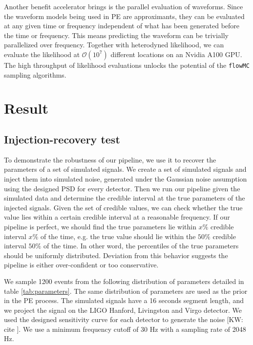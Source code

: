\documentclass[twocolumn]{aastex631}
\newcommand{\kw}[1]{{\color{rb4}[KW: #1 ]}}
\begin{document}
Another benefit accelerator brings is the parallel evaluation of waveforms. Since
the waveform models being used in PE are approximants, they can be evaluated at
any given time or frequency independent of what has been generated before the
time or frequency. This means predicting the waveform can be trivially
parallelized over frequency. Together with heterodyned likelihood, we can
evaluate the likelihood at $\mathcal{O}(10^7)$ different locations on an Nvidia
A100 GPU. The high throughput of likelihood evaluations unlocks the potential of
the \texttt{flowMC} sampling algorithms.

\section{Result}
\label{sec: Result}
\subsection{Injection-recovery test}

To demonstrate the robustness of our pipeline, we use it to recover the
parameters of a set of simulated signals. We create a set of simulated signals
and inject them into simulated noise, generated under the Gaussian noise
assumption using the designed PSD for every detector. Then we run our pipeline
given the simulated data and determine the credible interval at the true
parameters of the injected signals. Given the set of credible values, we can
check whether the true value lies within a certain credible interval at a
reasonable frequency. If our pipeline is perfect, we should find the true
parameters lie within $x\%$ credible interval $x\%$ of the time, e.g. the true
value should lie within the $50\%$ credible interval $50\%$ of the time. In
other word, the percentiles of the true parameters should be uniformly
distributed. Deviation from this behavior suggests the pipeline is either
over-confident or too conservative. 

We sample 1200 events from the following distribution of parameters detailed in
table \ref{tab:parameters}.
The same distribution of parameters are used as the prior in the PE process.
The simulated signals have a 16 seconds segment length,
and we project the signal on the LIGO Hanford, Livingston and Virgo detector.
We used the designed sensitivity curve for each detector to generate the noise \kw{cite}.
We use a minimum frequency cutoff of 30 Hz with a sampling rate of 2048 Hz.
\end{document}
